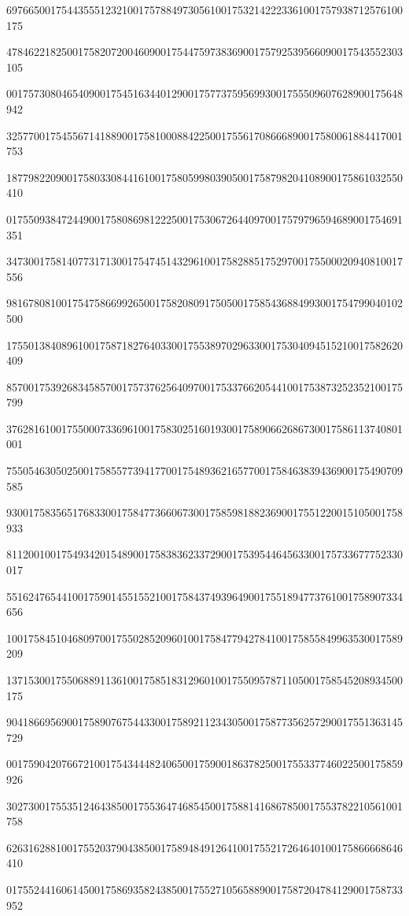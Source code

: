 \documentclass[10pt]{article}
\begin{document}
697665001754435551232100175788497305610017532142223361001757938712576100175\par
478462218250017582072004609001754475973836900175792539566090017543552303105\par
001757308046540900175451634401290017577375956993001755509607628900175648942\par
325770017545567141889001758100088422500175561708666890017580061884417001753\par
187798220900175803308441610017580599803905001758798204108900175861032550410\par
017550938472449001758086981222500175306726440970017579796594689001754691351\par
347300175814077317130017547451432961001758288517529700175500020940810017556\par
981678081001754758669926500175820809175050017585436884993001754799040102500\par
175501384089610017587182764033001755389702963300175304094515210017582620409\par
857001753926834585700175737625640970017533766205441001753873252352100175799\par
376281610017550007336961001758302516019300175890662686730017586113740801001\par
755054630502500175855773941770017548936216577001758463839436900175490709585\par
930017583565176833001758477366067300175859818823690017551220015105001758933\par
811200100175493420154890017583836233729001753954464563300175733677752330017\par
551624765441001759014551552100175843749396490017551894773761001758907334656\par
100175845104680970017550285209601001758477942784100175855849963530017589209\par
137153001755068891136100175851831296010017550957871105001758545208934500175\par
904186695690017589076754433001758921123430500175877356257290017551363145729\par
001759042076672100175434448240650017590018637825001755337746022500175859926\par
302730017553512464385001755364746854500175881416867850017553782210561001758\par
626316288100175520379043850017589484912641001755217264640100175866668646410\par
017552441606145001758693582438500175527105658890017587204784129001758733952\par
\end{document}
